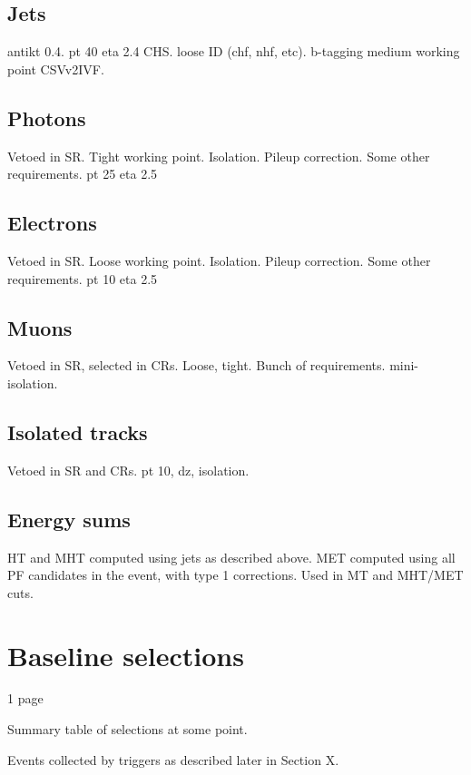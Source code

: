 \subsection*{Jets}

antikt 0.4.
pt 40 eta 2.4
CHS.
loose ID (chf, nhf, etc).
b-tagging medium working point CSVv2IVF.

\subsection*{Photons}

Vetoed in SR.
Tight working point. Isolation. Pileup correction. Some other requirements.
pt 25 eta 2.5

\subsection*{Electrons}

Vetoed in SR.
Loose working point. Isolation. Pileup correction. Some other requirements.
pt 10 eta 2.5

\subsection*{Muons}

Vetoed in SR, selected in CRs.
Loose, tight.
Bunch of requirements.
mini-isolation.

\subsection*{Isolated tracks}

Vetoed in SR and CRs.
pt 10, dz, isolation.

\subsection*{Energy sums}

HT and MHT computed using jets as described above.
MET computed using all PF candidates in the event, with type 1 corrections. 
Used in MT and MHT/MET cuts.

\section{Baseline selections}
1 page

Summary table of selections at some point.

Events collected by triggers as described later in Section X.

